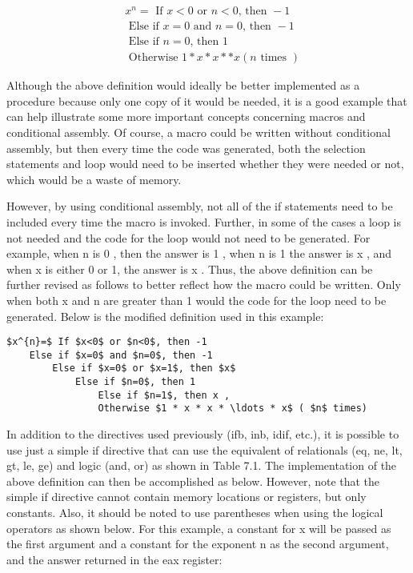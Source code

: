 \documentclass[10pt]{article}
\begin{document}
$$
\begin{aligned}
& x^{n}=\text { If } x<0 \text { or } n<0 \text {, then }-1 \\
& \text { Else if } x=0 \text { and } n=0 \text {, then }-1 \\
& \text { Else if } n=0 \text {, then } 1 \\
& \text { Otherwise } 1 * x * x * * x(n \text { times })
\end{aligned}
$$

Although the above definition would ideally be better implemented as a procedure because only one copy of it would be needed, it is a good example that can help illustrate some more important concepts concerning macros and conditional assembly. Of course, a macro could be written without conditional assembly, but then every time the code was generated, both the selection statements and loop would need to be inserted whether they were needed or not, which would be a waste of memory.

However, by using conditional assembly, not all of the if statements need to be included every time the macro is invoked. Further, in some of the cases a loop is not needed and the code for the loop would not need to be generated. For example, when n is 0 , then the answer is 1 , when n is 1 the answer is x , and when x is either 0 or 1, the answer is x . Thus, the above definition can be further revised as follows to better reflect how the macro could be written. Only when both x and n are greater than 1 would the code for the loop need to be generated. Below is the modified definition used in this example:

\begin{verbatim}
$x^{n}=$ If $x<0$ or $n<0$, then -1
    Else if $x=0$ and $n=0$, then -1
        Else if $x=0$ or $x=1$, then $x$
            Else if $n=0$, then 1
                Else if $n=1$, then x ,
                Otherwise $1 * x * x * \ldots * x$ ( $n$ times)
\end{verbatim}

In addition to the directives used previously (ifb, inb, idif, etc.), it is possible to use just a simple if directive that can use the equivalent of relationals (eq, ne, lt, gt, le, ge) and logic (and, or) as shown in Table 7.1. The implementation of the above definition can then be accomplished as below. However, note that the simple if directive cannot contain memory locations or registers, but only constants. Also, it should be noted to use parentheses when using the logical operators as shown below. For this example, a constant for x will be passed as the first argument and a constant for the exponent n as the second argument, and the answer returned in the eax register:
\end{document}
